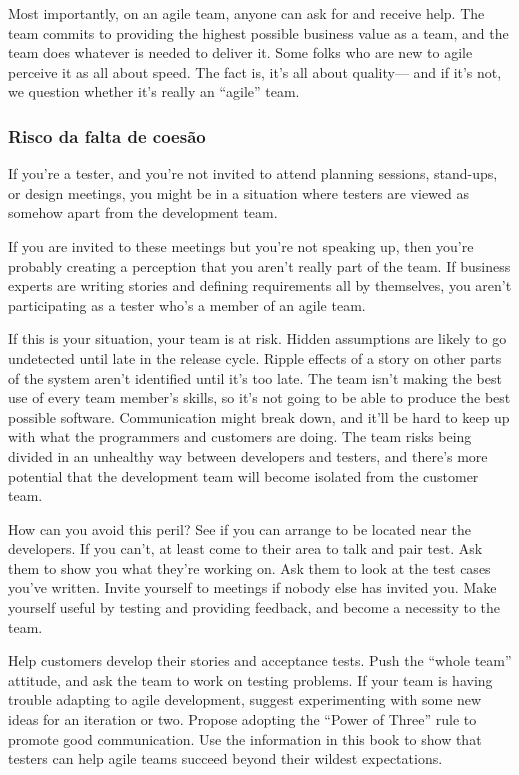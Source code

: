 \documentclass[
	12pt,				%
	openright,			%
	oneside,			%
	a4paper,			%
	english,			%
	brazil,				%
	]{abntex2}
\begin{document}
Most importantly, on an agile team, anyone can ask for and receive help. The team commits to providing the highest possible business value as a team, and the team does whatever is needed to deliver it. Some folks who are new to agile perceive it as all about speed. The fact is, it’s all about quality— and if it’s not, we question whether it’s really an “agile” team.

\subsubsection{Risco da falta de coesão}
If you’re a tester, and you’re not invited to attend planning sessions, stand-ups, or design meetings, you might be in a situation where testers are viewed as somehow apart from the development team.

If you are invited to these meetings but you’re not speaking up, then you’re probably creating a perception that you aren’t really part of the team. If business experts are writing stories and defining requirements all by themselves, you aren’t participating as a tester who’s a member of an agile team.

If this is your situation, your team is at risk. Hidden assumptions are likely to go undetected until late in the release cycle. Ripple effects of a story on other parts of the system aren’t identified until it’s too late. The team isn’t making the best use of every team member’s skills, so it’s not going to be able to produce the best possible software. Communication might break down, and it’ll be hard to keep up with what the programmers and customers are doing. The team risks being divided in an unhealthy way between developers and testers, and there’s more potential that the development team will become isolated from the customer team.

How can you avoid this peril? See if you can arrange to be located near the developers. If you can’t, at least come to their area to talk and pair test. Ask them to show you what they’re working on. Ask them to look at the test cases you’ve written. Invite yourself to meetings if nobody else has invited you. Make yourself useful by testing and providing feedback, and become a necessity to the team.

Help customers develop their stories and acceptance tests. Push the “whole team” attitude, and ask the team to work on testing problems. If your team is having trouble adapting to agile development, suggest experimenting with some new ideas for an iteration or two. Propose adopting the “Power of Three” rule to promote good communication. Use the information in this book to show that testers can help agile teams succeed beyond their wildest expectations.
\end{document}
